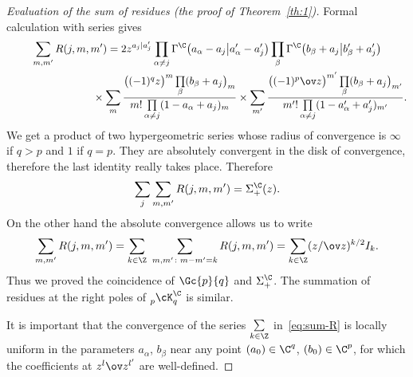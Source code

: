 \begin{proof}[Evaluation of the sum of residues (the proof of Theorem~\ref{th:1})]
Formal calculation with series gives
\begin{gather*}
\sum_{m,m'} R(j,m,m')=
2 z^{a_j|a_j'}
 \prod_{\alpha\ne j} \Gamma^\C\big(a_\alpha-a_j\big|a_\alpha'-a_j'\big)
 \prod_{\beta}
 \Gamma^\C\big(b_\beta+a_j\big|b_\beta'+a_j'\big)
\\
\hphantom{\sum_{m,m'} R(j,m,m')=}{} \times
 \sum_m \frac{ \big((-1)^{q} z\big)^m \prod\limits_{\beta}(b_\beta+a_j\big)_m} {m!\prod\limits_{\alpha\ne j} (1-a_\alpha+a_j)_m}
 \times
 \sum_{m'} \frac{ \big((-1)^{p} \ov z\big)^{m'} \prod\limits_{\beta}(b_\beta+a_j\big)_{m'}}
 {m'!\prod\limits_{\alpha\ne j} (1-a_\alpha'+a_j')_{m'}} .
 \end{gather*}
We get a product of two hypergeometric series whose radius of convergence
is $\infty$ if $q>p$ and $1$ if $q=p$.
They are absolutely convergent in the disk of convergence,
therefore the last identity really takes place.
Therefore
\[
\sum_j \sum_{m,m'} R(j,m,m')=\Sigma^\C_+ (z).
\]
On the other hand the absolute convergence allows us to write
 \begin{equation}
 \sum_{m,m'} R(j,m,m')=\sum_{k\in\Z}\,\,
\sum_{m,m'\colon m-m'=k} R(j,m,m')=\sum_{k\in\Z} (z/\ov z)^{k/2} I_k.
 \label{eq:sum-R}
 \end{equation}
Thus we proved the coincidence of $\Gc{p}{q}$ and $\Sigma_+^\C$.
The summation of residues at the right poles of
$_p^{\vphantom{\C}}\cK^\C_q$ is similar.

It is important that the convergence of the series $\sum\limits_{k\in\Z}$
in~\eqref{eq:sum-R} is locally uniform in the parameters
$a_\alpha$, $b_\beta$ near any point $(a_0)\in\C^q$, $(b_0)\in\C^p$,
for which the coefficients at $z^l\ov z^{l'}$ are well-defined.
\end{proof}
